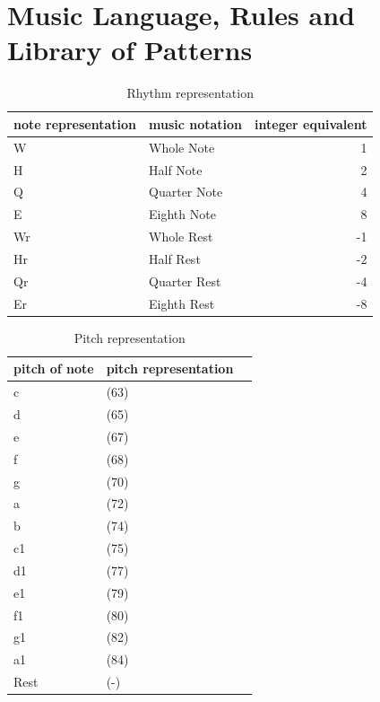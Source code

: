 \section{Music Language, Rules and Library of Patterns}

\begin{table}[H]
\caption{Rhythm representation}
\label{musiclang}
\centering
\begin{tabular}{|l|l|r|} 
\hline
note representation & music notation & integer equivalent  \\ 
\hline
W                   & Whole Note     & 1                   \\ 
\hline
H                   & Half Note      & 2                   \\ 
\hline
Q                   & Quarter Note   & 4                   \\ 
\hline
E                   & Eighth Note    & 8                   \\ 
\hline
Wr                  & Whole Rest     & -1                  \\ 
\hline
Hr                  & Half Rest      & -2                  \\ 
\hline
Qr                  & Quarter Rest   & -4                  \\ 
\hline
Er                  & Eighth Rest    & -8                  \\
\hline
\end{tabular}
\end{table}

\begin{table}[H]
\caption{Pitch representation}
\label{pitchVal}
\centering
\begin{tabular}{|l|l|r|} 
\hline
pitch of note & pitch representation   \\ 
\hline
c                   & (63)                     \\ 
\hline
d                   & (65)                      \\ 
\hline
e                   & (67)                      \\ 
\hline
f                   & (68)                    \\ 
\hline
g                   & (70)                      \\ 
\hline
a                   & (72)                       \\ 
\hline
b                   & (74)                    \\ 
\hline
c1                   & (75)                    \\ 
\hline
d1                   & (77)                    \\ 
\hline
e1                   & (79)                    \\ 
\hline
f1                   & (80)                    \\ 
\hline
g1                   & (82)                    \\ 
\hline
a1                   & (84)                    \\ 
\hline
Rest                   & (-)                    \\ 
\hline
\end{tabular}
\end{table}

